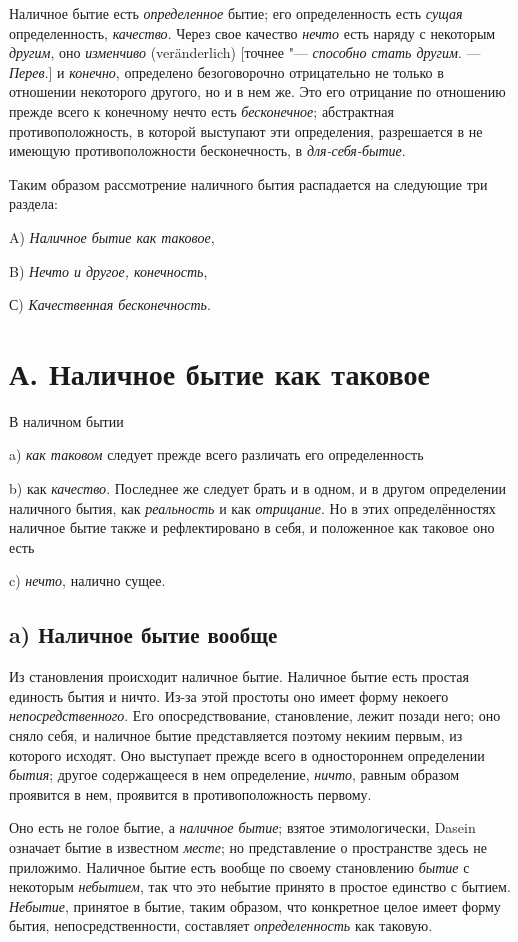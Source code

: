Наличное бытие есть {\em определенное} бытие; его
определенность есть {\em сущая} определенность,
{\em качество}. Через свое качество
{\em нечто} есть наряду с некоторым
{\em другим}, оно {\em изменчиво}
(veränderlich) [точнее "--- {\em способно стать другим}. —
{\em Перев}.] и {\em конечно},
определено безоговорочно отрицательно не только в отношении некоторого
другого, но и в нем же. Это его отрицание по отношению прежде всего к
конечному нечто есть {\em бесконечное}; абстрактная
противоположность, в которой выступают эти определения, разрешается в не
имеющую противоположности бесконечность, в
{\em для-себя-бытие}.

Таким образом рассмотрение наличного бытия распадается на следующие три
раздела:

A) {\em Наличное бытие как таковое},

B) {\em Нечто и другое, конечность},

С) {\em Качественная бесконечность}.

\section*{А. Наличное бытие как таковое}
В наличном бытии

a) {\em как таковом} следует прежде всего различать его
определенность

b) как {\em качество}. Последнее же следует брать и в
одном, и в другом определении наличного бытия, как
{\em реальность} и как
{\em отрицание}. Но в этих определённостях наличное
бытие также и рефлектировано в себя, и положенное как таковое оно есть

c) {\em нечто}, налично сущее.

\subsection*{a) Наличное бытие вообще}
Из становления происходит наличное бытие. Наличное бытие есть простая
единость бытия и ничто. Из-за этой простоты оно имеет форму некоего
{\em непосредственного}. Его опосредствование,
становление, лежит позади него; оно сняло себя, и наличное бытие
представляется поэтому некиим первым, из которого исходят. Оно выступает
прежде всего в одностороннем определении {\em бытия};
другое содержащееся в нем определение, {\em ничто},
равным образом проявится в нем, проявится в противоположность первому.

Оно есть не голое бытие, а {\em наличное бытие}; взятое
этимологически, Dasein означает бытие в известном
{\em месте}; но представление о пространстве здесь не
приложимо. Наличное бытие есть вообще по своему становлению
{\em бытие} с некоторым
{\em небытием}, так что это небытие принято в простое
единство с бытием. {\em Небытие}, принятое в бытие,
таким образом, что конкретное целое имеет форму бытия, непосредственности,
составляет {\em определенность} как таковую.

